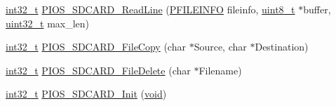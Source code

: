 \begin{DoxyCompactItemize}
\item 
\hyperlink{group___n_a_m_e_gafd12020da5a235dfcf0c3c748fb5baed}{int32\-\_\-t} \hyperlink{group___p_i_o_s___s_d_c_a_r_d_ga62d56f09b8671dcc6e51e5a917af7a5e}{P\-I\-O\-S\-\_\-\-S\-D\-C\-A\-R\-D\-\_\-\-Read\-Line} (\hyperlink{_common_2_libraries_2dosfs_2dosfs_8h_a7e176967adef3fee89b5cc83d7daa32e}{P\-F\-I\-L\-E\-I\-N\-F\-O} fileinfo, \hyperlink{stdint_8h_aba7bc1797add20fe3efdf37ced1182c5}{uint8\-\_\-t} $\ast$buffer, \hyperlink{stdint_8h_a435d1572bf3f880d55459d9805097f62}{uint32\-\_\-t} max\-\_\-len)
\item 
\hyperlink{group___n_a_m_e_gafd12020da5a235dfcf0c3c748fb5baed}{int32\-\_\-t} \hyperlink{group___p_i_o_s___s_d_c_a_r_d_ga8e032d776f07a10dd65fe1809087f1f6}{P\-I\-O\-S\-\_\-\-S\-D\-C\-A\-R\-D\-\_\-\-File\-Copy} (char $\ast$Source, char $\ast$Destination)
\item 
\hyperlink{group___n_a_m_e_gafd12020da5a235dfcf0c3c748fb5baed}{int32\-\_\-t} \hyperlink{group___p_i_o_s___s_d_c_a_r_d_ga4a5ddda9425e947f6087000ab3161440}{P\-I\-O\-S\-\_\-\-S\-D\-C\-A\-R\-D\-\_\-\-File\-Delete} (char $\ast$Filename)
\item 
\hyperlink{group___n_a_m_e_gafd12020da5a235dfcf0c3c748fb5baed}{int32\-\_\-t} \hyperlink{group___p_i_o_s___s_d_c_a_r_d_ga8514647c05a1b0bfaf66f0f3c4710268}{P\-I\-O\-S\-\_\-\-S\-D\-C\-A\-R\-D\-\_\-\-Init} (\hyperlink{group___n_a_m_e_ga18028b8badbf1ea7e704ccac3c488e82}{void})
\end{DoxyCompactItemize}
